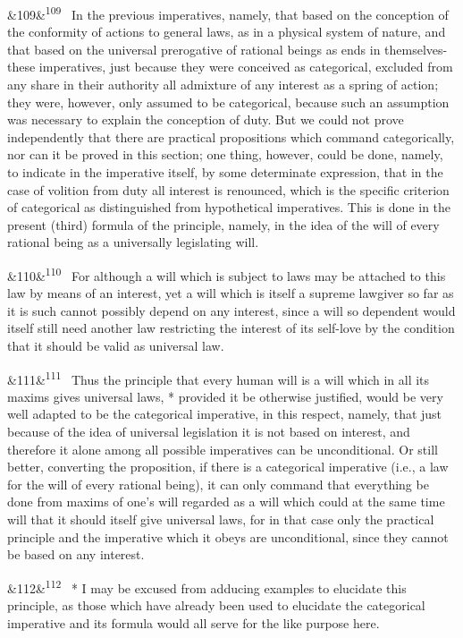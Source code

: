 \documentclass[12pt]{article}
\newcommand{\para}[1][]{\par\noindent\ifx&#1&\else\textsuperscript{\footnotesize #1}~\fi}
\begin{document}
\para[109] In the previous imperatives, namely, that based on the conception of the conformity of actions to general laws, as in a physical system of nature, and that based on the universal prerogative of rational beings as ends in themselves- these imperatives, just because they were conceived as categorical, excluded from any share in their authority all admixture of any interest as a spring of action; they were, however, only assumed to be categorical, because such an assumption was necessary to explain the conception of duty. But we could not prove independently that there are practical propositions which command categorically, nor can it be proved in this section; one thing, however, could be done, namely, to indicate in the imperative itself, by some determinate expression, that in the case of volition from duty all interest is renounced, which is the specific criterion of categorical as distinguished from hypothetical imperatives. This is done in the present (third) formula of the principle, namely, in the idea of the will of every rational being as a universally legislating will.

\para[110] For although a will which is subject to laws may be attached to this law by means of an interest, yet a will which is itself a supreme lawgiver so far as it is such cannot possibly depend on any interest, since a will so dependent would itself still need another law restricting the interest of its self-love by the condition that it should be valid as universal law.

\para[111] Thus the principle that every human will is a will which in all its maxims gives universal laws, * provided it be otherwise justified, would be very well adapted to be the categorical imperative, in this respect, namely, that just because of the idea of universal legislation it is not based on interest, and therefore it alone among all possible imperatives can be unconditional. Or still better, converting the proposition, if there is a categorical imperative (i.e., a law for the will of every rational being), it can only command that everything be done from maxims of one's will regarded as a will which could at the same time will that it should itself give universal laws, for in that case only the practical principle and the imperative which it obeys are unconditional, since they cannot be based on any interest.

\para[112] * I may be excused from adducing examples to elucidate this principle, as those which have already been used to elucidate the categorical imperative and its formula would all serve for the like purpose here.
\end{document}
